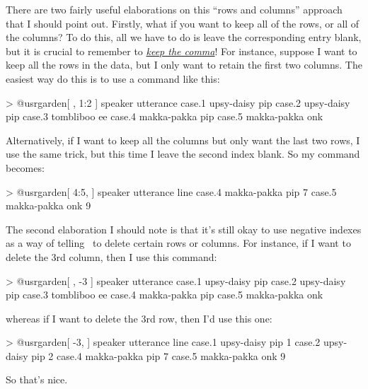 There are two fairly useful elaborations on this ``rows and columns'' approach that I should point out. Firstly, what if you want to keep all of the rows, or all of the columns? To do this, all we have to do is leave the corresponding entry blank, but it is crucial to remember to \underline{\it keep the comma}! For instance, suppose I want to keep all the rows in the  data, but I only want to retain the first two columns. The easiest way do this is to use a command like this:
\begin{rblock1}
> @usr{garden[ , 1:2 ]}
           speaker utterance
case.1  upsy-daisy       pip
case.2  upsy-daisy       pip
case.3   tombliboo        ee
case.4 makka-pakka       pip
case.5 makka-pakka       onk
\end{rblock1}
Alternatively, if I want to keep all the columns but only want the last two rows, I use the same trick, but this time I leave the second index blank. So my command becomes:
\begin{rblock1}
> @usr{garden[ 4:5, ]}
           speaker utterance line
case.4 makka-pakka       pip    7
case.5 makka-pakka       onk    9
\end{rblock1}

The second elaboration I should note is that it's still okay to use negative indexes as a way of telling \R\ to delete certain rows or columns. For instance, if I want to delete the 3rd column, then I use this command:
\begin{rblock1}
> @usr{garden[ , -3 ]}
           speaker utterance
case.1  upsy-daisy       pip
case.2  upsy-daisy       pip
case.3   tombliboo        ee
case.4 makka-pakka       pip
case.5 makka-pakka       onk
\end{rblock1}
whereas if I want to delete the 3rd row, then I'd use this one:
\begin{rblock1}
> @usr{garden[ -3,  ]}
           speaker utterance line
case.1  upsy-daisy       pip    1
case.2  upsy-daisy       pip    2
case.4 makka-pakka       pip    7
case.5 makka-pakka       onk    9
\end{rblock1}
So that's nice.



